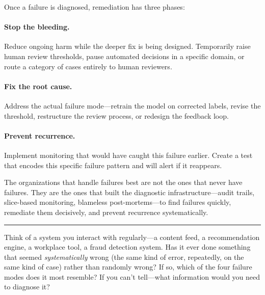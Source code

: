 Once a failure is diagnosed, remediation has three phases:

\paragraph{Stop the bleeding.} Reduce ongoing harm while the deeper fix is being designed. Temporarily raise human review thresholds, pause automated decisions in a specific domain, or route a category of cases entirely to human reviewers.

\paragraph{Fix the root cause.} Address the actual failure mode---retrain the model on corrected labels, revise the threshold, restructure the review process, or redesign the feedback loop.

\paragraph{Prevent recurrence.} Implement monitoring that would have caught this failure earlier. Create a test that encodes this specific failure pattern and will alert if it reappears.

\begin{keyconcept}
The organizations that handle \hitl failures best are not the ones that never have failures. They are the ones that built the diagnostic infrastructure---audit trails, slice-based monitoring, blameless post-mortems---to find failures quickly, remediate them decisively, and prevent recurrence systematically.
\end{keyconcept}

\bigskip
\begin{center}
\rule{0.5\textwidth}{0.4pt}
\end{center}
\bigskip

\begin{trythis}
Think of a \hitl system you interact with regularly---a content feed, a recommendation engine, a workplace tool, a fraud detection system. Has it ever done something that seemed \textit{systematically} wrong (the same kind of error, repeatedly, on the same kind of case) rather than randomly wrong? If so, which of the four failure modes does it most resemble? If you can't tell---what information would you need to diagnose it?
\end{trythis}

